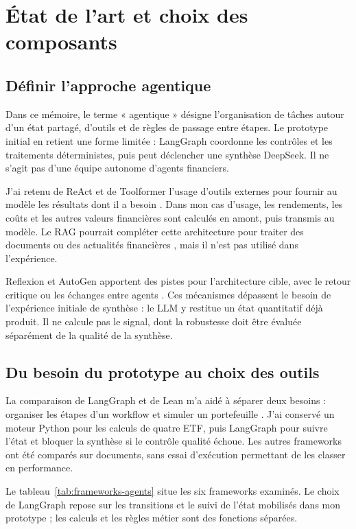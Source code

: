 \chapter{État de l'art et choix des composants}\label{cap:etat-art}

\section{Définir l'approche agentique}

Dans ce mémoire, le terme « agentique » désigne l'organisation de tâches autour d'un état partagé, d'outils et de règles de passage entre étapes. Le prototype initial en retient une forme limitée : LangGraph coordonne les contrôles et les traitements déterministes, puis peut déclencher une synthèse DeepSeek. Il ne s'agit pas d'une équipe autonome d'agents financiers.

J'ai retenu de ReAct et de Toolformer l'usage d'outils externes pour fournir au modèle les résultats dont il a besoin \citep{yao2023react,schick2023toolformer}. Dans mon cas d'usage, les rendements, les coûts et les autres valeurs financières sont calculés en amont, puis transmis au modèle. Le RAG pourrait compléter cette architecture pour traiter des documents ou des actualités financières \citep{lewis2020rag}, mais il n'est pas utilisé dans l'expérience.

Reflexion et AutoGen apportent des pistes pour l'architecture cible, avec le retour critique ou les échanges entre agents \citep{shinn2023reflexion,wu2023autogen}. Ces mécanismes dépassent le besoin de l'expérience initiale de synthèse : le LLM y restitue un état quantitatif déjà produit. Il ne calcule pas le signal, dont la robustesse doit être évaluée séparément de la qualité de la synthèse.


\section{Du besoin du prototype au choix des outils}

La comparaison de LangGraph et de Lean m'a aidé à séparer deux besoins : organiser les étapes d'un workflow et simuler un portefeuille \citep{githubLangGraph,githubLean}. J'ai conservé un moteur Python pour les calculs de quatre ETF, puis LangGraph pour suivre l'état et bloquer la synthèse si le contrôle qualité échoue. Les autres frameworks ont été comparés sur documents, sans essai d'exécution permettant de les classer en performance.

Le tableau~\ref{tab:frameworks-agents} situe les six frameworks examinés. Le choix de LangGraph repose sur les transitions et le suivi de l'état mobilisés dans mon prototype ; les calculs et les règles métier sont des fonctions séparées.

